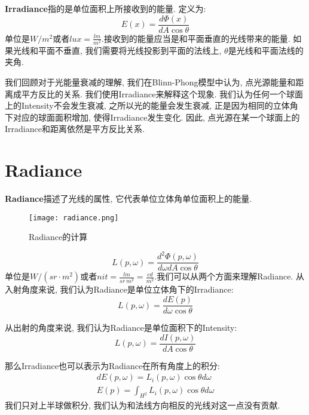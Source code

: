 \documentclass[openany]{progbookcn}
\begin{document}
\textbf{Irradiance}指的是单位面积上所接收到的能量. 定义为: 
\begin{equation}
	E(x)=\frac{d\Phi(x)}{dA\cos\theta}
\end{equation} 单位是$W/m^2$或者$lux=\frac{lm}{m^2}$.接收到的能量应当是和平面垂直的光线带来的能量. 如果光线和平面不垂直, 我们需要将光线投影到平面的法线上, $\theta$是光线和平面法线的夹角. 

我们回顾对于光能量衰减的理解, 我们在Blinn-Phong模型中认为, 点光源能量和距离成平方反比的关系. 我们使用Irradiance来解释这个现象. 我们认为任何一个球面上的Intensity不会发生衰减, 之所以光的能量会发生衰减, 正是因为相同的立体角下对应的球面面积增加, 使得Irradiance发生变化. 因此, 点光源在某一个球面上的Irradiance和距离依然是平方反比关系. 

\section{Radiance}
\textbf{Radiance}描述了光线的属性, 它代表单位立体角单位面积上的能量. 
\begin{figure}[H]
	\centering
	\texttt{[image: radiance.png]}
	\caption{Radiance的计算}
	\label{fig:radiance}
\end{figure}

\begin{equation}
	L(p,\omega)=\frac{d^2\Phi(p,\omega)}{d\omega dA\cos\theta}
\end{equation} 单位是$W/(sr\cdot m^2)$或者$nit=\frac{lm}{sr\ m^2}=\frac{cd}{m^2}$.我们可以从两个方面来理解Radiance. 从入射角度来说, 我们认为Radiance是单位立体角下的Irradiance: 
\begin{equation}
	L(p,\omega)=\frac{dE(p)}{d\omega \cos\theta}
\end{equation}

从出射的角度来说, 我们认为Radiance是单位面积下的Intensity: 
\begin{equation}
		L(p,\omega)=\frac{dI(p,\omega)}{dA \cos\theta}
\end{equation}

那么Irradiance也可以表示为Radiance在所有角度上的积分: 
\begin{equation}
	\begin{split}
		dE(p,\omega)=L_i(p,\omega)\cos\theta d\omega\\
		E(p)=\int_{H^2}L_i(p,\omega)\cos\theta d\omega
	\end{split}
\end{equation}我们只对上半球做积分, 我们认为和法线方向相反的光线对这一点没有贡献. 
\end{document}
